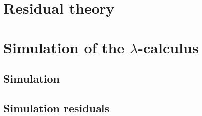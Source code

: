 \chapter{Residual theory}


\chapter{Simulation of the $\lambda$-calculus}

\section{Simulation}

\section{Simulation residuals}


